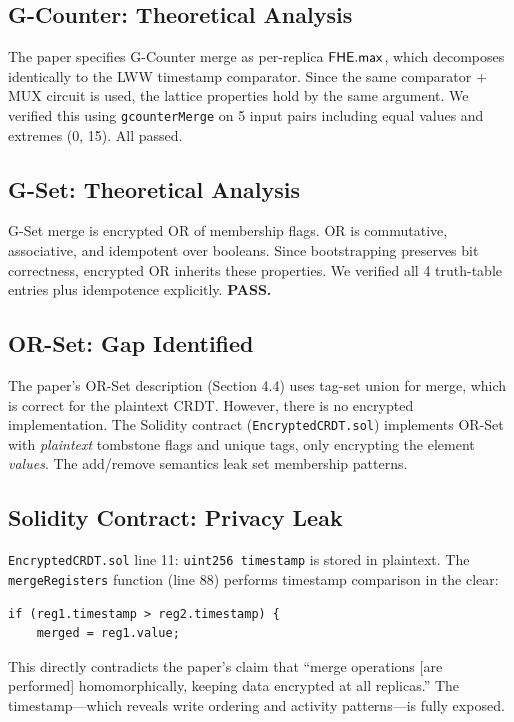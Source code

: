 \documentclass{../shared/luxfhe}
\begin{document}
\subsection{G-Counter: Theoretical Analysis}

The paper specifies G-Counter merge as per-replica $\mathsf{FHE.max}$, which
decomposes identically to the LWW timestamp comparator.  Since the
same comparator + MUX circuit is used, the lattice properties hold by
the same argument.  We verified this using \texttt{gcounterMerge} on
5 input pairs including equal values and extremes (0, 15).  All passed.

\subsection{G-Set: Theoretical Analysis}

G-Set merge is encrypted OR of membership flags.  OR is commutative,
associative, and idempotent over booleans.  Since bootstrapping
preserves bit correctness, encrypted OR inherits these properties.
We verified all 4 truth-table entries plus idempotence explicitly.
\textbf{PASS.}

\subsection{OR-Set: Gap Identified}

The paper's OR-Set description (Section 4.4) uses tag-set union for
merge, which is correct for the plaintext CRDT.  However, there is no
encrypted implementation.  The Solidity contract (\texttt{EncryptedCRDT.sol})
implements OR-Set with \emph{plaintext} tombstone flags and unique tags,
only encrypting the element \emph{values}.  The add/remove semantics leak
set membership patterns.

\subsection{Solidity Contract: Privacy Leak}

\texttt{EncryptedCRDT.sol} line 11: \texttt{uint256 timestamp} is
stored in plaintext.  The \texttt{mergeRegisters} function (line 88)
performs timestamp comparison in the clear:
\begin{lstlisting}[language=Solidity]
if (reg1.timestamp > reg2.timestamp) {
    merged = reg1.value;
\end{lstlisting}
This directly contradicts the paper's claim that ``merge operations
[are performed] homomorphically, keeping data encrypted at all
replicas.''  The timestamp---which reveals write ordering and
activity patterns---is fully exposed.
\end{document}
